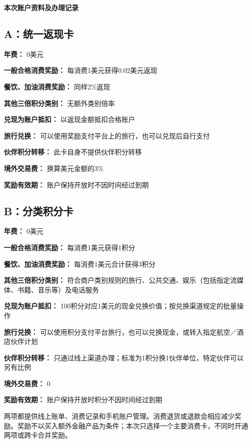 \documentclass[UTF8,fontset=none,11pt,a4paper]{ctexart}
\begin{document}
{\noindent\fontsize{20}{25}\selectfont\bfseries 本次账户资料及办理记录\par}
\vspace{10pt}
\subsection*{A：统一返现卡}
\textbf{年费：} 0美元


\textbf{一般合格消费奖励：} 每消费1美元获得0.02美元返现


\textbf{餐饮、加油消费奖励：} 同样2\%返现


\textbf{其他三倍积分类别：} 无额外类别倍率


\textbf{兑现为账户抵扣：} 以返现金额抵扣合格账户


\textbf{旅行兑换：} 可以使用奖励支付平台上的旅行，也可以兑现后自行支付


\textbf{伙伴积分转移：} 此卡自身不提供伙伴积分转移


\textbf{境外交易费：} 换算美元金额的3\%


\textbf{奖励有效期：} 账户保持开放时不因时间经过到期


\subsection*{B：分类积分卡}
\textbf{年费：} 0美元


\textbf{一般合格消费奖励：} 每消费1美元获得1积分


\textbf{餐饮、加油消费奖励：} 每消费1美元合计获得3积分


\textbf{其他三倍积分类别：} 符合商户类别规则的旅行、公共交通、娱乐（包括指定流媒体、书籍、音乐等）及电话服务


\textbf{兑现为账户抵扣：} 100积分对应1美元的现金兑换价值；按兑换渠道规定的批量操作


\textbf{旅行兑换：} 可以使用积分支付平台旅行，也可以兑换现金，或转入指定航空／酒店伙伴计划


\textbf{伙伴积分转移：} 只通过线上渠道办理；标准为1积分换1伙伴单位，特定伙伴可以另有比例


\textbf{境外交易费：} 0


\textbf{奖励有效期：} 账户保持开放时积分不因时间经过到期


两项都提供线上账单、消费记录和手机账户管理。消费退货或退款会相应减少奖励。奖励不以买入额外金融产品为条件；本次只选择一个主要消费卡，不同时开通两项或跨卡合并奖励。
\end{document}
